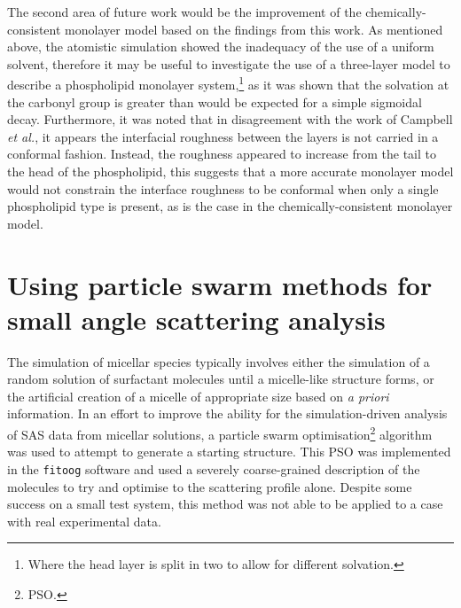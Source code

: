 The second area of future work would be the improvement of the chemically-consistent monolayer model based on the findings from this work.
As mentioned above, the atomistic simulation showed the inadequacy of the use of a uniform solvent, therefore it may be useful to investigate the use of a three-layer model to describe a phospholipid monolayer system,\footnote{Where the head layer is split in two to allow for different solvation.} as it was shown that the solvation at the carbonyl group is greater than would be expected for a simple sigmoidal decay.
Furthermore, it was noted that in disagreement with the work of Campbell \emph{et al.}, it appears the interfacial roughness between the layers is not carried in a conformal fashion.
Instead, the roughness appeared to increase from the tail to the head of the phospholipid, this suggests that a more accurate monolayer model would not constrain the interface roughness to be conformal when only a single phospholipid type is present, as is the case in the chemically-consistent monolayer model.

\section{Using particle swarm methods for small angle scattering analysis}
The simulation of micellar species typically involves either the simulation of a random solution of surfactant molecules until a micelle-like structure forms, or the artificial creation of a micelle of appropriate size based on \emph{a priori} information.
In an effort to improve the ability for the simulation-driven analysis of SAS data from micellar solutions, a particle swarm optimisation\footnote{PSO.} algorithm was used to attempt to generate a starting structure.
This PSO was implemented in the \texttt{fitoog} software and used a severely coarse-grained description of the molecules to try and optimise to the scattering profile alone.
Despite some success on a small test system, this method was not able to be applied to a case with real experimental data.


